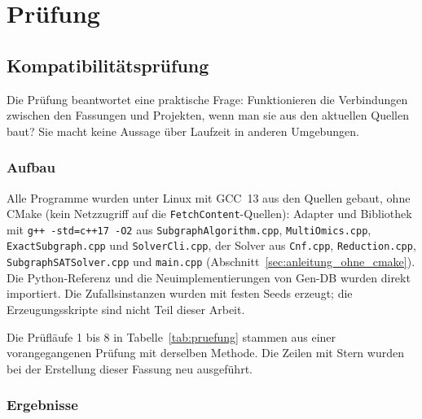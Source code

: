 
\part{Prüfung}

\chapter{Kompatibilitätsprüfung}
\label{chap:pruefung}

Die Prüfung beantwortet eine praktische Frage: Funktionieren die Verbindungen zwischen den Fassungen und Projekten, wenn man sie aus den aktuellen Quellen baut? Sie macht keine Aussage über Laufzeit in anderen Umgebungen.

\section{Aufbau}

Alle Programme wurden unter Linux mit GCC~13 aus den Quellen gebaut, ohne CMake (kein Netzzugriff auf die \texttt{FetchContent}-Quellen): Adapter und Bibliothek mit \texttt{g++ -std=c++17 -O2} aus \texttt{SubgraphAlgorithm.cpp}, \texttt{MultiOmics.cpp}, \texttt{ExactSubgraph.cpp} und \texttt{SolverCli.cpp}, der Solver aus \texttt{Cnf.cpp}, \texttt{Reduction.cpp}, \texttt{SubgraphSATSolver.cpp} und \texttt{main.cpp} (Abschnitt~\ref{sec:anleitung_ohne_cmake}). Die Python-Referenz und die Neuimplementierungen von Gen-DB wurden direkt importiert. Die Zufallsinstanzen wurden mit festen Seeds erzeugt; die Erzeugungsskripte sind nicht Teil dieser Arbeit.

Die Prüfläufe 1 bis 8 in Tabelle~\ref{tab:pruefung} stammen aus einer vorangegangenen Prüfung mit derselben Methode. Die Zeilen mit Stern wurden bei der Erstellung dieser Fassung neu ausgeführt.

\section{Ergebnisse}

